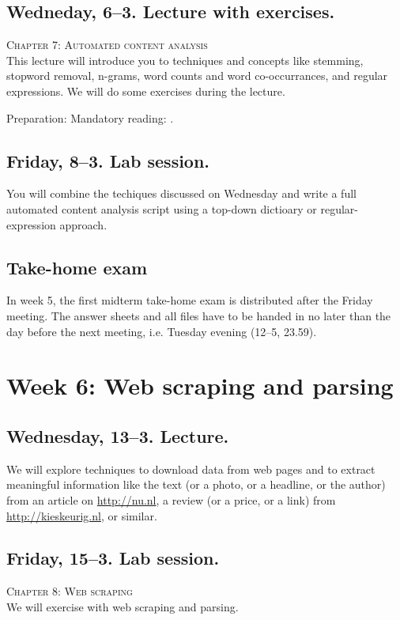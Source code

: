 \subsection*{Wedneday, 6--3. Lecture with exercises.}
\textsc{ Chapter 7: Automated content analysis}\\
This lecture will introduce you to techniques and concepts like stemming, stopword removal, n-grams, word counts and word co-occurrances, and regular expressions. We will do some exercises during the lecture.

Preparation: Mandatory reading: \cite{Boumans2016}. 




\subsection*{Friday, 8--3. Lab session.}
You will combine the techiques discussed on Wednesday and write a full automated content analysis script using a top-down dictioary or regular-expression approach.



\subsection*{Take-home exam}
In week 5, the first midterm take-home exam is distributed after the Friday meeting. The answer sheets and all files have to be handed in no later than the day before the next meeting, i.e. Tuesday evening (12--5, 23.59).




\section*{Week 6: Web scraping and parsing}

\subsection*{Wednesday, 13--3. Lecture.}
We will explore techniques to download data from web pages and to extract meaningful information like the text (or a photo, or a headline, or the author) from an article on \url{http://nu.nl}, a review (or a price, or a link) from \url{http://kieskeurig.nl}, or similar. 

\subsection*{Friday, 15--3. Lab session.}
\textsc{ Chapter 8: Web scraping}\\
We will exercise with web scraping and parsing.





